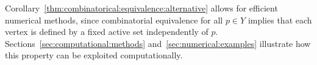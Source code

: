 \documentclass[smallextended]{svjour3}       %
\numberwithin{equation}{section}
\DeclareMathOperator*{\conv}{conv}
\begin{document}
%
Corollary~\ref{thm:combinatorical:equivalence:alternative}
allows for efficient numerical methods, since combinatorial equivalence for all $p\in Y$ implies that each vertex is defined by a fixed active set independently of $p$.
%
Sections~\ref{sec:computational:methods} and~\ref{sec:numerical:examples} illustrate how this property can be exploited computationally.
%

\end{document}
